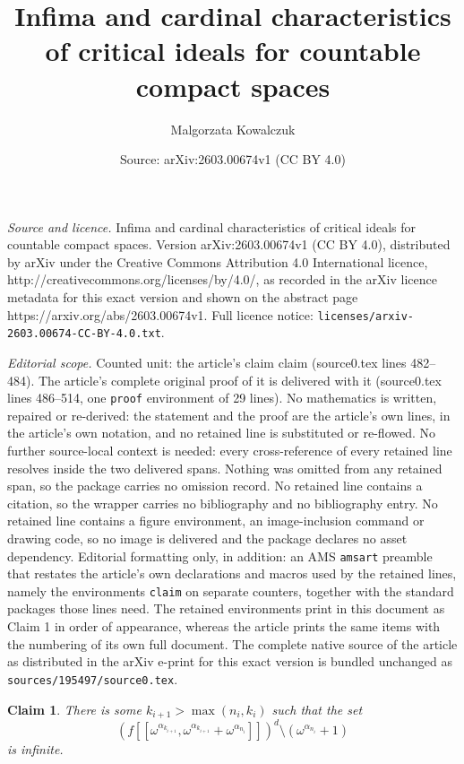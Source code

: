 \documentclass[10pt,a4paper]{amsart}
\title{Infima and cardinal characteristics of critical ideals for countable compact spaces}
\author{Malgorzata Kowalczuk}
\date{Source: arXiv:2603.00674v1 (CC BY 4.0)}
\newtheorem{claim}{Claim}
\begin{document}
\maketitle

\noindent\emph{Source and licence.} Infima and cardinal characteristics of critical ideals for countable compact spaces. Version arXiv:2603.00674v1 (CC BY 4.0), distributed by arXiv under the Creative Commons Attribution 4.0 International licence, http://creativecommons.org/licenses/by/4.0/, as recorded in the arXiv licence metadata for this exact version and shown on the abstract page https://arxiv.org/abs/2603.00674v1. Full licence notice: \texttt{licenses/arxiv-2603.00674-CC-BY-4.0.txt}.\par\smallskip

\noindent\textit{Editorial scope.} Counted unit: the article's claim claim (source0.tex lines 482--484). The article's complete original proof of it is delivered with it (source0.tex lines 486--514, one \texttt{proof} environment of 29 lines). No mathematics is written, repaired or re-derived: the statement and the proof are the article's own lines, in the article's own notation, and no retained line is substituted or re-flowed.  No further source-local context is needed: every cross-reference of every retained line resolves inside the two delivered spans.  Nothing was omitted from any retained span, so the package carries no omission record.  No retained line contains a citation, so the wrapper carries no bibliography and no bibliography entry.  No retained line contains a figure environment, an image-inclusion command or drawing code, so no image is delivered and the package declares no asset dependency.  Editorial formatting only, in addition: an AMS \texttt{amsart} preamble that restates the article's own declarations and macros used by the retained lines, namely the environments \texttt{claim} on separate counters, together with the standard packages those lines need.  The retained environments print in this document as Claim 1 in order of appearance, whereas the article prints the same items with the numbering of its own full document.  The complete native source of the article as distributed in the arXiv e-print for this exact version is bundled unchanged as \texttt{sources/195497/source0.tex}.
\begin{claim}    
There is some $k_{i+1}>\max(n_i,k_i)$ such that the set $$(f[[\omega^{\alpha_{k_{i+1}}},\omega^{\alpha_{k_{i+1}}}+\omega^{\alpha_{n_i}}]])^d\setminus (\omega^{\alpha_{n_i}}+1)$$ is infinite.
\end{claim}
\end{document}
